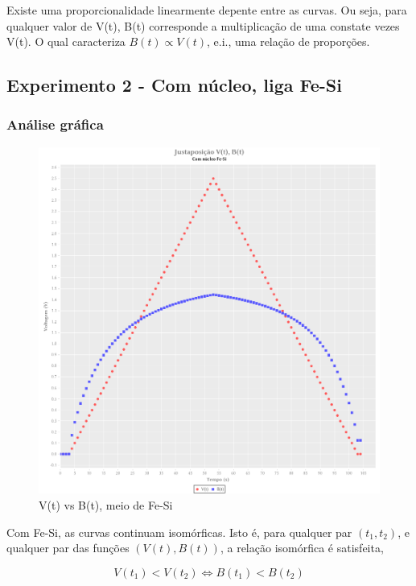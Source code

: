 \documentclass[11pt]{article}
\begin{document}
Existe uma proporcionalidade linearmente depente entre as curvas. Ou seja, para qualquer valor de V(t), B(t) corresponde a multiplicação de uma constate vezes V(t). O qual caracteriza \(B(t) \propto V(t)\), e.i., uma relação de proporções.

\subsection{Experimento 2 - Com núcleo, liga Fe-Si}
\label{sec:org8be7789}

\subsubsection{Análise gráfica}
\label{sec:org183bc3b}
{\begin{figure}[htbp]

\includegraphics[width=.9\linewidth]{img-plots/V-B-justaposicao-com-nucleo.png}
\caption{V(t) vs B(t), meio de Fe-Si}
\end{figure}}

Com Fe-Si, as curvas continuam isomórficas. Isto é, para qualquer par \((t_1, t_2)\), e qualquer par das funções \((V(t),B(t))\), a relação isomórfica \cite{pinter2014book} é satisfeita,

\begin{equation}
   V(t_1) < V(t_2) \Leftrightarrow B(t_1) < B(t_2)
\end{equation}
\end{document}
